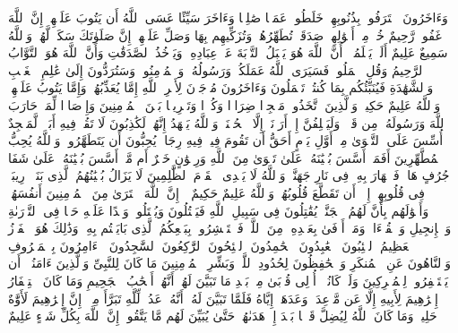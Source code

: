 \stopbuffer
\startbuffer[\q:9:102]
وَءَاخَرُونَ ٱعۡتَرَفُوا۟ بِذُنُوبِهِمۡ خَلَطُوا۟ عَمَلࣰا صَٰلِحࣰا وَءَاخَرَ سَیِّئًا عَسَى ٱللَّهُ أَن یَتُوبَ عَلَیۡهِمۡۚ إِنَّ ٱللَّهَ غَفُورࣱ رَّحِیمٌ%
\stopbuffer
\startbuffer[\q:9:103]
خُذۡ مِنۡ أَمۡوَٰلِهِمۡ صَدَقَةࣰ تُطَهِّرُهُمۡ وَتُزَكِّیهِم بِهَا وَصَلِّ عَلَیۡهِمۡۖ إِنَّ صَلَوٰتَكَ سَكَنࣱ لَّهُمۡۗ وَٱللَّهُ سَمِیعٌ عَلِیمٌ%
\stopbuffer
\startbuffer[\q:9:104]
أَلَمۡ یَعۡلَمُوۤا۟ أَنَّ ٱللَّهَ هُوَ یَقۡبَلُ ٱلتَّوۡبَةَ عَنۡ عِبَادِهِۦ وَیَأۡخُذُ ٱلصَّدَقَٰتِ وَأَنَّ ٱللَّهَ هُوَ ٱلتَّوَّابُ ٱلرَّحِیمُ%
\stopbuffer
\startbuffer[\q:9:105]
وَقُلِ ٱعۡمَلُوا۟ فَسَیَرَى ٱللَّهُ عَمَلَكُمۡ وَرَسُولُهُۥ وَٱلۡمُؤۡمِنُونَۖ وَسَتُرَدُّونَ إِلَىٰ عَٰلِمِ ٱلۡغَیۡبِ وَٱلشَّهَٰدَةِ فَیُنَبِّئُكُم بِمَا كُنتُمۡ تَعۡمَلُونَ%
\stopbuffer
\startbuffer[\q:9:106]
وَءَاخَرُونَ مُرۡجَوۡنَ لِأَمۡرِ ٱللَّهِ إِمَّا یُعَذِّبُهُمۡ وَإِمَّا یَتُوبُ عَلَیۡهِمۡۗ وَٱللَّهُ عَلِیمٌ حَكِیمࣱ%
\stopbuffer
\startbuffer[\q:9:107]
وَٱلَّذِینَ ٱتَّخَذُوا۟ مَسۡجِدࣰا ضِرَارࣰا وَكُفۡرࣰا وَتَفۡرِیقَۢا بَیۡنَ ٱلۡمُؤۡمِنِینَ وَإِرۡصَادࣰا لِّمَنۡ حَارَبَ ٱللَّهَ وَرَسُولَهُۥ مِن قَبۡلُۚ وَلَیَحۡلِفُنَّ إِنۡ أَرَدۡنَاۤ إِلَّا ٱلۡحُسۡنَىٰۖ وَٱللَّهُ یَشۡهَدُ إِنَّهُمۡ لَكَٰذِبُونَ%
\stopbuffer
\startbuffer[\q:9:108]
لَا تَقُمۡ فِیهِ أَبَدࣰاۚ لَّمَسۡجِدٌ أُسِّسَ عَلَى ٱلتَّقۡوَىٰ مِنۡ أَوَّلِ یَوۡمٍ أَحَقُّ أَن تَقُومَ فِیهِۚ فِیهِ رِجَالࣱ یُحِبُّونَ أَن یَتَطَهَّرُوا۟ۚ وَٱللَّهُ یُحِبُّ ٱلۡمُطَّهِّرِینَ%
\stopbuffer
\startbuffer[\q:9:109]
أَفَمَنۡ أَسَّسَ بُنۡیَٰنَهُۥ عَلَىٰ تَقۡوَىٰ مِنَ ٱللَّهِ وَرِضۡوَٰنٍ خَیۡرٌ أَم مَّنۡ أَسَّسَ بُنۡیَٰنَهُۥ عَلَىٰ شَفَا جُرُفٍ هَارࣲ فَٱنۡهَارَ بِهِۦ فِی نَارِ جَهَنَّمَۗ وَٱللَّهُ لَا یَهۡدِی ٱلۡقَوۡمَ ٱلظَّٰلِمِینَ%
\stopbuffer
\startbuffer[\q:9:110]
لَا یَزَالُ بُنۡیَٰنُهُمُ ٱلَّذِی بَنَوۡا۟ رِیبَةࣰ فِی قُلُوبِهِمۡ إِلَّاۤ أَن تَقَطَّعَ قُلُوبُهُمۡۗ وَٱللَّهُ عَلِیمٌ حَكِیمٌ%
\stopbuffer
\startbuffer[\q:9:111]
۞ إِنَّ ٱللَّهَ ٱشۡتَرَىٰ مِنَ ٱلۡمُؤۡمِنِینَ أَنفُسَهُمۡ وَأَمۡوَٰلَهُم بِأَنَّ لَهُمُ ٱلۡجَنَّةَۚ یُقَٰتِلُونَ فِی سَبِیلِ ٱللَّهِ فَیَقۡتُلُونَ وَیُقۡتَلُونَۖ وَعۡدًا عَلَیۡهِ حَقࣰّا فِی ٱلتَّوۡرَىٰةِ وَٱلۡإِنجِیلِ وَٱلۡقُرۡءَانِۚ وَمَنۡ أَوۡفَىٰ بِعَهۡدِهِۦ مِنَ ٱللَّهِۚ فَٱسۡتَبۡشِرُوا۟ بِبَیۡعِكُمُ ٱلَّذِی بَایَعۡتُم بِهِۦۚ وَذَٰلِكَ هُوَ ٱلۡفَوۡزُ ٱلۡعَظِیمُ%
\stopbuffer
\startbuffer[\q:9:112]
ٱلتَّٰۤئِبُونَ ٱلۡعَٰبِدُونَ ٱلۡحَٰمِدُونَ ٱلسَّٰۤئِحُونَ ٱلرَّٰكِعُونَ ٱلسَّٰجِدُونَ ٱلۡءَامِرُونَ بِٱلۡمَعۡرُوفِ وَٱلنَّاهُونَ عَنِ ٱلۡمُنكَرِ وَٱلۡحَٰفِظُونَ لِحُدُودِ ٱللَّهِۗ وَبَشِّرِ ٱلۡمُؤۡمِنِینَ%
\stopbuffer
\startbuffer[\q:9:113]
مَا كَانَ لِلنَّبِیِّ وَٱلَّذِینَ ءَامَنُوۤا۟ أَن یَسۡتَغۡفِرُوا۟ لِلۡمُشۡرِكِینَ وَلَوۡ كَانُوۤا۟ أُو۟لِی قُرۡبَىٰ مِنۢ بَعۡدِ مَا تَبَیَّنَ لَهُمۡ أَنَّهُمۡ أَصۡحَٰبُ ٱلۡجَحِیمِ%
\stopbuffer
\startbuffer[\q:9:114]
وَمَا كَانَ ٱسۡتِغۡفَارُ إِبۡرَٰهِیمَ لِأَبِیهِ إِلَّا عَن مَّوۡعِدَةࣲ وَعَدَهَاۤ إِیَّاهُ فَلَمَّا تَبَیَّنَ لَهُۥۤ أَنَّهُۥ عَدُوࣱّ لِّلَّهِ تَبَرَّأَ مِنۡهُۚ إِنَّ إِبۡرَٰهِیمَ لَأَوَّٰهٌ حَلِیمࣱ%
\stopbuffer
\startbuffer[\q:9:115]
وَمَا كَانَ ٱللَّهُ لِیُضِلَّ قَوۡمَۢا بَعۡدَ إِذۡ هَدَىٰهُمۡ حَتَّىٰ یُبَیِّنَ لَهُم مَّا یَتَّقُونَۚ إِنَّ ٱللَّهَ بِكُلِّ شَیۡءٍ عَلِیمٌ%
\stopbuffer
